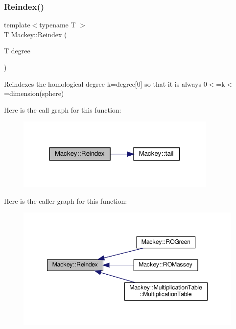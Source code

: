 \subsubsection{\texorpdfstring{Reindex()}{Reindex()}\hspace{0.1cm}{\footnotesize\ttfamily [1/2]}}
{\footnotesize\ttfamily template$<$typename T $>$ \\
T Mackey\+::\+Reindex (\begin{DoxyParamCaption}\item[{T}]{degree }\end{DoxyParamCaption})\hspace{0.3cm}{\ttfamily [inline]}}



Reindexes the homological degree k=degree\mbox{[}0\mbox{]} so that it is always 0$<$=k$<$=dimension(sphere) 

Here is the call graph for this function\+:\nopagebreak
\begin{figure}[H]
\begin{center}
\leavevmode
\includegraphics[width=279pt]{namespaceMackey_a7da73ade3ee83c4ffd614e79242d7c04_cgraph}
\end{center}
\end{figure}
Here is the caller graph for this function\+:\nopagebreak
\begin{figure}[H]
\begin{center}
\leavevmode
\includegraphics[width=347pt]{namespaceMackey_a7da73ade3ee83c4ffd614e79242d7c04_icgraph}
\end{center}
\end{figure}
\mbox{\label{namespaceMackey_acb84c147d9ee39eac2883a762e3710dd}} 
